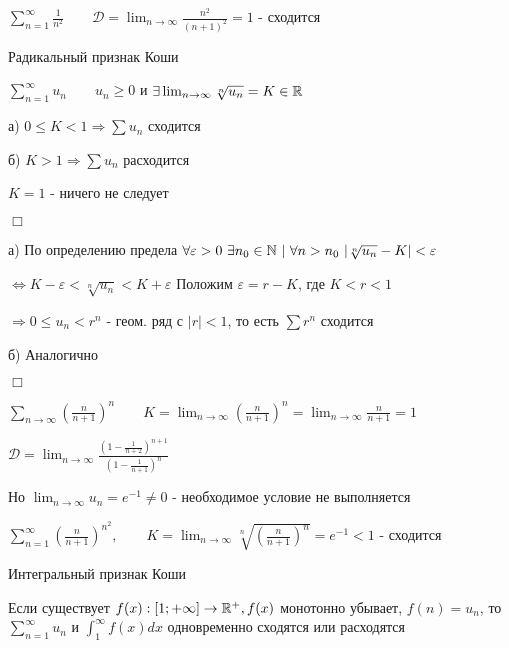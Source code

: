 \documentclass[12pt]{article}
\begin{document}
    $\sum_{n = 1}^\infty \frac{1}{n^2} \quad\quad \mathcal{D} = \lim_{n \to \infty} \frac{n^2}{(n + 1)^2} = 1$ - сходится

    \hypertarget{cauchyradicalsign}{}

    \begin{MyTheorem}
         Радикальный признак Коши

        $\sum_{n = 1}^\infty u_n \quad\quad u_n \geq 0$ и $\exists \lim_{n \to \infty} \sqrt[n]{u_n} = K \in \mathbb{R}$

        а) $0 \leq K < 1 \Longrightarrow \sum u_n$ сходится

        б) $K > 1 \Longrightarrow \sum u_n$ расходится
    \end{MyTheorem}

    \Notas $K = 1$ - ничего не следует

    \begin{MyProof}
        $\Box$

        а) По определению предела $\forall \varepsilon > 0 \ \exists n_0 \in \Natural \ | \ \forall n > n_0 \ |\sqrt[n]{u_n} - K| < \varepsilon$

        $\Longleftrightarrow K - \varepsilon < \sqrt[n]{u_n} < K + \varepsilon$ Положим $\varepsilon = r - K$, где $K < r < 1$

        $\Longrightarrow 0 \leq u_n < r^n$ - геом. ряд с $|r| < 1$, то есть $\sum r^n$ сходится

        б) Аналогично

        $\Box$
    \end{MyProof}

     $\sum_{n \to \infty} \left(\frac{n}{n + 1}\right)^n \quad\quad K = \lim_{n \to \infty} \left(\frac{n}{n + 1}\right)^n = \lim_{n \to \infty} \frac{n}{n + 1} = 1$

    $\mathcal{D} = \lim_{n \to \infty} \frac{\left(1 - \frac{1}{n + 2}\right)^{n + 1}}{\left(1 - \frac{1}{n + 1}\right)^{n}}$

    Но $\lim_{n \to \infty} u_n = e^{-1} \neq 0$ - необходимое условие не выполняется

     $\sum_{n = 1}^\infty \left(\frac{n}{n + 1}\right)^{n^2}, \quad\quad K = \lim_{n \to \infty} \sqrt[n]{\left(\frac{n}{n + 1}\right)^n} = e^{-1} < 1$ - сходится

    \hypertarget{cauchyintegralsign}{}

    \begin{MyTheorem}
         Интегральный признак Коши

        Если существует $f(x) : [1; +\infty] \to \mathbb{R}^+, f(x)$ монотонно убывает, $f(n) = u_n$, то $\sum_{n = 1}^\infty u_n$ и $\int_{1}^\infty f(x) dx$ одновременно сходятся или расходятся
    \end{MyTheorem}
\end{document}
